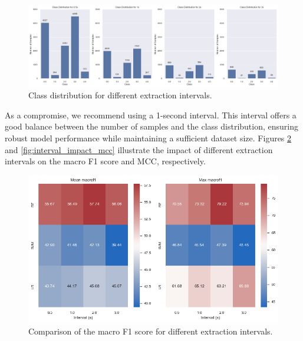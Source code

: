 \begin{figure}[htbp]
    \centering
    \includegraphics[width=1\textwidth]{./images/interval_class_distribution.png}
    \caption{Class distribution for different extraction intervals.}
    \label{fig:interval_class_distribution}
\end{figure}

As a compromise, we recommend using a 1-second interval. This interval offers a good balance between 
the number of samples and the class distribution, ensuring robust model performance while maintaining a 
sufficient dataset size. Figures \ref{fig:interval_impact_macrof1} and \ref{fig:interval_impact_mcc} illustrate the impact of 
different extraction intervals on the macro F1 score and MCC, respectively.

\begin{figure}[H]
    \centering
    \includegraphics[width=1\columnwidth]{./images/interval_impact_macrof1.png}
    \caption{Comparison of the macro F1 score for different extraction intervals.}
    \label{fig:interval_impact_macrof1}
\end{figure}


